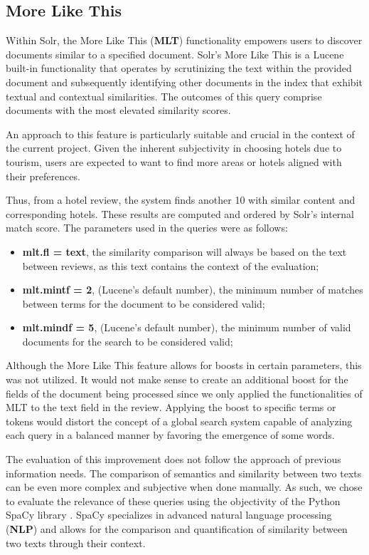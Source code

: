 \documentclass[sigconf]{acmart}
\begin{document}
\renewcommand{\thesubsection}{\arabic{section}.3}
\subsection{More Like This}

Within Solr, the More Like This (\textbf{MLT}) functionality empowers users to discover documents similar to a specified document. Solr's More Like This is a Lucene \cite{Lucene} built-in functionality that operates by scrutinizing the text within the provided document and subsequently identifying other documents in the index that exhibit textual and contextual similarities. The outcomes of this query comprise documents with the most elevated similarity scores.

An approach to this feature is particularly suitable and crucial in the context of the current project. Given the inherent subjectivity in choosing hotels due to tourism, users are expected to want to find more areas or hotels aligned with their preferences.

Thus, from a hotel review, the system finds another 10 with similar content and corresponding hotels. These results are computed and ordered by Solr's internal match score. The parameters used in the queries were as follows:

\begin{itemize}
    \item \textbf{mlt.fl = text}, the similarity comparison will always be based on the text between reviews, as this text contains the context of the evaluation;
    \item \textbf{mlt.mintf = 2}, (Lucene's default number), the minimum number of matches between terms for the document to be considered valid;
    \item \textbf{mlt.mindf = 5}, (Lucene's default number), the minimum number of valid documents for the search to be considered valid;
\end{itemize}

Although the More Like This feature allows for boosts in certain parameters, this was not utilized. It would not make sense to create an additional boost for the fields of the document being processed since we only applied the functionalities of MLT to the text field in the review. Applying the boost to specific terms or tokens would distort the concept of a global search system capable of analyzing each query in a balanced manner by favoring the emergence of some words.

The evaluation of this improvement does not follow the approach of previous information needs. The comparison of semantics and similarity between two texts can be even more complex and subjective when done manually. As such, we chose to evaluate the relevance of these queries using the objectivity of the Python SpaCy library \cite{Python_Spacy}. SpaCy specializes in advanced natural language processing (\textbf{NLP}) and allows for the comparison and quantification of similarity between two texts through their context.
\end{document}
